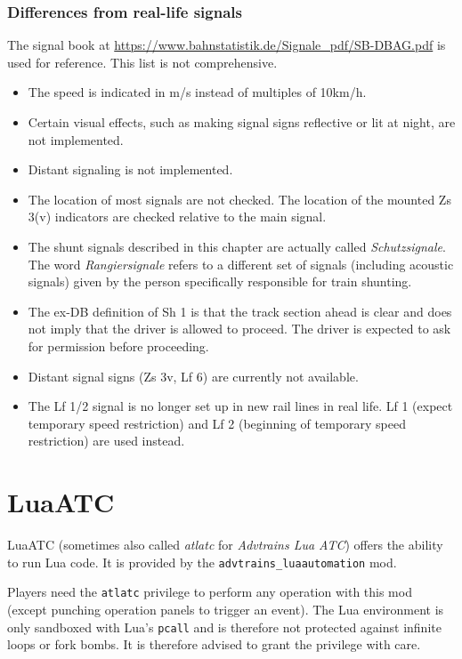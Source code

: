 \documentclass[notitlepage]{article}
\begin{document}
\subsubsection{Differences from real-life signals}
The signal book at \url{https://www.bahnstatistik.de/Signale_pdf/SB-DBAG.pdf} is used for reference. This list is not comprehensive.
\begin{itemize}
\item The speed is indicated in m/s instead of multiples of 10km/h.
\item Certain visual effects, such as making signal signs reflective or lit at night, are not implemented.
\item Distant signaling is not implemented.
\item The location of most signals are not checked. The location of the mounted Zs 3(v) indicators are checked relative to the main signal.
\item The shunt signals described in this chapter are actually called \textit{Schutzsignale}. The word \textit{Rangiersignale} refers to a different set of signals (including acoustic signals) given by the person specifically responsible for train shunting.
\item The ex-DB definition of Sh 1 is that the track section ahead is clear and does not imply that the driver is allowed to proceed. The driver is expected to ask for permission before proceeding.
\item Distant signal signs (Zs 3v, Lf 6) are currently not available.
\item The Lf 1/2 signal is no longer set up in new rail lines in real life. Lf 1 (expect temporary speed restriction) and Lf 2 (beginning of temporary speed restriction) are used instead.
\end{itemize}

\section{LuaATC}\label{s:luaatc}

LuaATC (sometimes also called \textit{atlatc} for \textit{Advtrains Lua ATC}) offers the ability to run Lua code. It is provided by the \texttt{advtrains\_luaautomation} mod.

Players need the \texttt{atlatc} privilege to perform any operation with this mod (except punching operation panels to trigger an event). The Lua environment is only sandboxed with Lua's \texttt{pcall} and is therefore not protected against infinite loops or fork bombs. It is therefore advised to grant the privilege with care.
\end{document}
